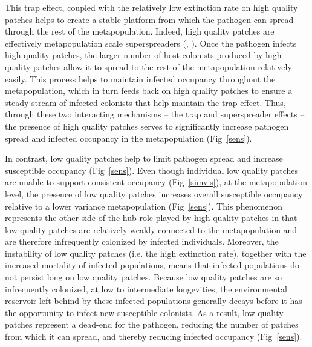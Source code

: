 \documentclass{svjour3}
\begin{document}
This trap effect, coupled with the relatively low extinction rate on high quality patches helps to create a stable platform from which the pathogen can spread through the rest of the metapopulation.  Indeed, high quality patches are effectively metapopulation scale superspreaders (\cite{Lloyd-Smith2005}, \cite{Paull2012}).  Once the pathogen infects high quality patches, the larger number of host colonists produced by high quality patches allow it to spread to the rest of the metapopulation relatively easily.  This process helps to maintain infected occupancy throughout the metapopulation, which in turn feeds back on high quality patches to ensure a steady stream of infected colonists that help maintain the trap effect.  Thus, through these two interacting mechanisms -- the trap and superspreader effects -- the presence of high quality patches serves to significantly increase pathogen spread and infected occupancy in the metapopulation (Fig~\ref{sens}).  

In contrast, low quality patches help to limit pathogen spread and increase susceptible occupancy (Fig~\ref{sens}). Even though individual low quality patches are unable to support consistent occupancy (Fig~\ref{simvis}), at the metapopulation level, the presence of low quality patches increases overall susceptible occupancy relative to a lower variance metapopulation (Fig~\ref{sens}).   This phenomenon represents the other side of the hub role played by high quality patches in that low quality patches are relatively weakly connected to the metapopulation and are therefore infrequently colonized by infected individuals.  Moreover, the instability of low quality patches (i.e. the high extinction rate), together with the increased mortality of infected populations, means that infected populations do not persist long on low quality patches.  Because low quality patches are so infrequently colonized, at low to intermediate longevities, the environmental reservoir left behind by these infected populations generally decays before it has the opportunity to infect new susceptible colonists.  As a result, low quality patches represent a dead-end for the pathogen, reducing the number of patches from which it can spread, and thereby reducing infected occupancy (Fig~\ref{sens}).  
\end{document}
